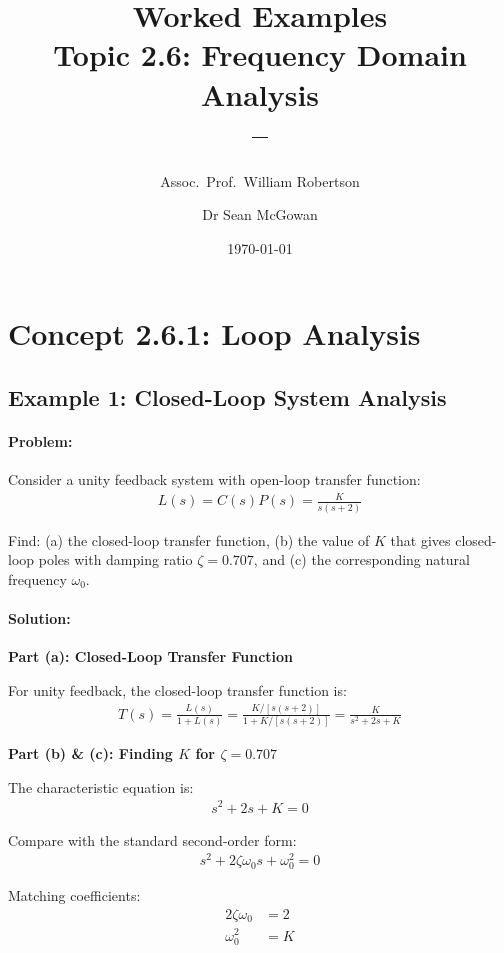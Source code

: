 \documentclass[11pt,a4paper]{article}
\title{\textbf{Worked Examples}\\[0.5em]
\large Topic 2.6: Frequency Domain Analysis\\[0.3em]
\normalsize \coursesubtitle{} -- \coursetitle}
\author{Assoc.\ Prof.\ William Robertson \and Dr Sean McGowan}
\date{\today}
\begin{document}
\maketitle
\tableofcontents
\newpage

\section{Concept 2.6.1: Loop Analysis}

\subsection{Example 1: Closed-Loop System Analysis}

\paragraph{Problem:} Consider a unity feedback system with open-loop transfer function:
\begin{align}
L(s) = C(s)P(s) = \frac{K}{s(s+2)}
\end{align}

Find: (a) the closed-loop transfer function, (b) the value of $K$ that gives closed-loop poles with damping ratio $\zeta = 0.707$, and (c) the corresponding natural frequency $\omega_0$.

\paragraph{Solution:}

\textbf{Part (a): Closed-Loop Transfer Function}

For unity feedback, the closed-loop transfer function is:
\begin{align}
T(s) = \frac{L(s)}{1 + L(s)} = \frac{K/[s(s+2)]}{1 + K/[s(s+2)]} = \frac{K}{s^2 + 2s + K}
\end{align}

\textbf{Part (b) \& (c): Finding $K$ for $\zeta = 0.707$}

The characteristic equation is:
\begin{align}
s^2 + 2s + K = 0
\end{align}

Compare with the standard second-order form:
\begin{align}
s^2 + 2\zeta\omega_0 s + \omega_0^2 = 0
\end{align}

Matching coefficients:
\begin{align}
2\zeta\omega_0 &= 2 \\
\omega_0^2 &= K
\end{align}
\end{document}
